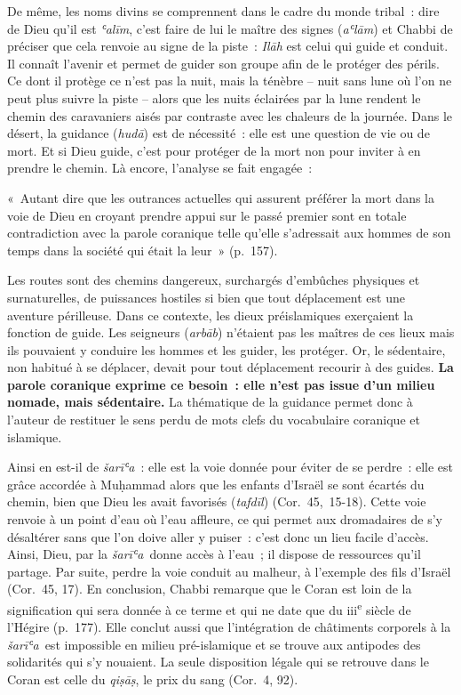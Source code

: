De même, les noms divins se comprennent dans le cadre du monde tribal~:
dire de Dieu qu'il est \emph{ʿalīm}, c'est faire de lui le maître des
signes (\emph{aʿlām}) et Chabbi de préciser que cela renvoie au signe de
la piste~: \emph{Ilāh} est celui qui guide et conduit. Il connaît
l'avenir et permet de guider son groupe afin de le protéger des périls.
Ce dont il protège ce n'est pas la nuit, mais la ténèbre -- nuit sans
lune où l'on ne peut plus suivre la piste -- alors que les nuits
éclairées par la lune rendent le chemin des caravaniers aisés par
contraste avec les chaleurs de la journée. Dans le désert, la guidance
(\emph{hudā}) est de nécessité~: elle est une question de vie ou de
mort. Et si Dieu guide, c'est pour protéger de la mort non pour inviter
à en prendre le chemin. Là encore, l'analyse se fait engagée~:

«~Autant dire que les outrances actuelles qui assurent préférer la mort
dans la voie de Dieu en croyant prendre appui sur le passé premier sont
en totale contradiction avec la parole coranique telle qu'elle
s'adressait aux hommes de son temps dans la société qui était la leur~»
(p.~157).

Les routes sont des chemins dangereux, surchargés d'embûches physiques
et surnaturelles, de puissances hostiles si bien que tout déplacement
est une aventure périlleuse. Dans ce contexte, les dieux préislamiques
exerçaient la fonction de guide. Les seigneurs (\emph{arbāb}) n'étaient
pas les maîtres de ces lieux mais ils pouvaient y conduire les hommes et
les guider, les protéger. Or, le sédentaire, non habitué à se déplacer,
devait pour tout déplacement recourir à des guides. \textbf{La parole
coranique exprime ce besoin~: elle n'est pas issue d'un milieu nomade,
mais sédentaire.} La thématique de la guidance permet donc à l'auteur de
restituer le sens perdu de mots clefs du vocabulaire coranique et
islamique.


Ainsi en est-il de \emph{šarīʿa}~: elle est la voie donnée pour éviter
de se perdre~: elle est grâce accordée à Muḥammad alors que les enfants
d'Israël se sont écartés du chemin, bien que Dieu les avait favorisés
(\emph{tafdīl}) (Cor.~45,~15-18). Cette voie renvoie à un point d'eau où
l'eau affleure, ce qui permet aux dromadaires de s'y désaltérer sans que
l'on doive aller y puiser~: c'est donc un lieu facile d'accès. Ainsi,
Dieu, par la \emph{šarīʿa}~donne accès à l'eau~; il dispose de
ressources qu'il partage. Par suite, perdre la voie conduit au malheur,
à l'exemple des fils d'Israël (Cor.~45, 17). En conclusion, Chabbi
remarque que le Coran est loin de la signification qui sera donnée à ce
terme et qui ne date que du iii\textsuperscript{e} siècle de l'Hégire
(p.~177). Elle conclut aussi que l'intégration de châtiments corporels à
la \emph{šarīʿa}~est impossible en milieu pré-islamique et se trouve aux
antipodes des solidarités qui s'y nouaient. La seule disposition légale
qui se retrouve dans le Coran est celle du \emph{qiṣāṣ}, le prix du sang
(Cor.~4, 92).

